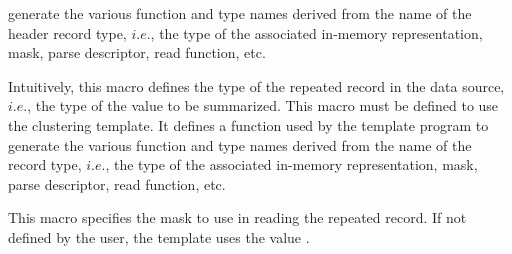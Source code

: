 \begin{description}
  generate the various function and type names derived from the name
  of the header record type, $i.e.$, the type of the associated in-memory
  representation, mask, parse descriptor, read function, etc.
\item[\cd{PADS\_TY}] Intuitively, this macro defines the type of the repeated
  record in the data source, $i.e.$, the type of the value to be
  summarized. This macro must be defined to use the clustering
  template. It defines a function used by the template program to
  generate the various function and type names derived from the name
  of the record type, $i.e.$, the type of the associated in-memory
  representation, mask, parse descriptor, read function, etc.
\item[\cd{READ\_MASK}] This macro specifies the mask to use in reading
  the repeated record. If not defined by the user, the template uses
  the value .

\end{description}
